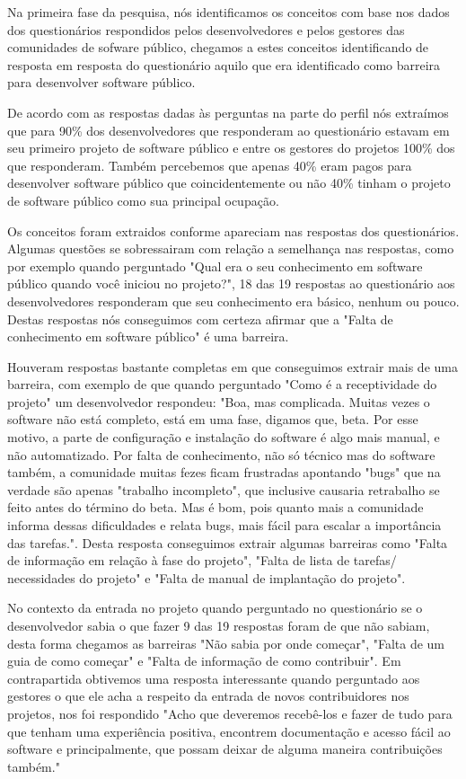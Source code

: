 Na primeira fase da pesquisa, nós identificamos os conceitos com base nos dados 
dos questionários respondidos pelos desenvolvedores e pelos gestores das comunidades de
sofware público, chegamos a estes conceitos identificando de resposta em resposta 
do questionário aquilo que era identificado como barreira para desenvolver 
software público.

De acordo com as respostas dadas às perguntas na parte do perfil nós extraímos
que para 90\% dos desenvolvedores que responderam ao questionário estavam 
em seu primeiro projeto de software público e entre os gestores do projetos
100\% dos que responderam. Também percebemos que apenas
40\% eram pagos para desenvolver software público que coincidentemente ou não
40\% tinham o projeto de software público como sua principal ocupação.

Os conceitos foram extraidos conforme apareciam nas respostas dos questionários.
Algumas questões se sobressairam com relação a semelhança nas respostas, como 
por exemplo quando perguntado "Qual era o seu conhecimento em software público 
quando você iniciou no projeto?", 18 das 19 respostas ao questionário aos desenvolvedores
responderam que seu conhecimento era básico, nenhum ou pouco. Destas respostas 
nós conseguimos com certeza afirmar que a "Falta de conhecimento em software público"
é uma barreira.

Houveram respostas bastante completas em que conseguimos extrair mais de uma barreira,
com exemplo de que quando perguntado "Como é a receptividade do projeto" um desenvolvedor
respondeu: "Boa, mas complicada. Muitas vezes o software não está completo, está em uma 
fase, digamos que, beta. Por esse motivo, a parte de configuração e instalação 
do software é algo mais manual, e não automatizado. Por falta de conhecimento, 
não só técnico mas do software também, a comunidade muitas fezes ficam frustradas 
apontando "bugs" que na verdade são apenas "trabalho incompleto", que inclusive 
causaria retrabalho se feito antes do término do beta. Mas é bom, pois quanto mais 
a comunidade informa dessas dificuldades e relata bugs, mais fácil para escalar a 
importância das tarefas.". Desta resposta conseguimos extrair algumas barreiras 
como "Falta de informação em relação à fase do projeto", "Falta de lista de tarefas/
necessidades do projeto" e "Falta de manual de implantação do projeto".

No contexto da entrada no projeto quando perguntado no questionário se o desenvolvedor
sabia o que fazer 9 das 19 respostas foram de que não sabiam, desta forma chegamos as
barreiras "Não sabia por onde começar", "Falta de um guia de como começar" e "Falta de 
informação de como contribuir". Em contrapartida obtivemos uma resposta interessante 
quando perguntado aos gestores o que ele acha a respeito da entrada de novos contribuidores
nos projetos, nos foi respondido "Acho que deveremos recebê-los e fazer de tudo 
para que tenham uma experiência positiva, encontrem documentação e acesso fácil ao 
software e principalmente, que possam deixar de alguma maneira contribuições também."

